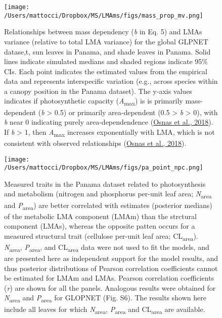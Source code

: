 \documentclass[
  12pt,
  letterpaper,
  DIV=11,
  numbers=noendperiod]{scrartcl}
\begin{document}
\begin{figure}

{\centering \texttt{[image: /Users/mattocci/Dropbox/MS/LMAms/figs/mass\_prop\_mv.png]}

}

\caption{\label{fig-mass_prop}Relationships between mass dependency
(\emph{b} in Eq. 5) and LMAs variance (relative to total LMA variance)
for the global GLPNET datase,t, sun leaves in Panama, and shade leaves
in Panama. Solid lines indicate simulated medians and shaded regions
indicate 95\% CIs. Each point indicates the estimated values from the
empirical data and represents interspecific variation (e.g., across
species within a canopy position in the Panama dataset). The y-axis
values indicates if photosynthetic capacity
(\emph{A}\textsubscript{max}) is is primarily mass-dependent (\emph{b}
\textgreater{} 0.5) or primarily area-dependent (0.5 \textgreater{}
\emph{b} \textgreater{} 0), with \emph{b} near 0 indicating purely
area-dependendence (\protect\hyperlink{ref-Osnas2018}{Osnas et al.,
2018}). If \emph{b} \textgreater{} 1, then \emph{A}\textsubscript{max}
increases exponentially with LMA, which is not consistent with observed
relationships (\protect\hyperlink{ref-Osnas2018}{Osnas et al., 2018}).}

\end{figure}

\newpage

\begin{figure}

{\centering \texttt{[image: /Users/mattocci/Dropbox/MS/LMAms/figs/pa\_point\_npc.png]}

}

\caption{\label{fig-pa_npc}Measured traits in the Panama dataset related
to photosynthesis and metabolism (nitrogen and phosphorus per-unit leaf
area; \emph{N}\textsubscript{area} and \emph{P}\textsubscript{area}) are
better correlated with estimates (posterior medians) of the metabolic
LMA component (LMAm) than the strctural component (LMAs), whereas the
opposite patten occurs for a measured structural trait (cellulose
per-unit leaf area; CL\textsubscript{area}).
\emph{N}\textsubscript{area}, \emph{P}\textsubscript{area}, and
CL\textsubscript{area} data were not used to fit the models, and are
presented here as independent support for the model results, and thus
posterior distributions of Pearson correlation coefficients cannot be
estimated for LMAm and LMAs. Pearson correlation coefficients (\emph{r})
are shown for all the panels. Analogous results were obtained for
\emph{N}\textsubscript{area} and \emph{P}\textsubscript{area} for
GLOPNET (Fig. S6). The results shown here include all leaves for which
\emph{N}\textsubscript{area}, \emph{P}\textsubscript{area} and
CL\textsubscript{area} are available.}

\end{figure}
\end{document}
